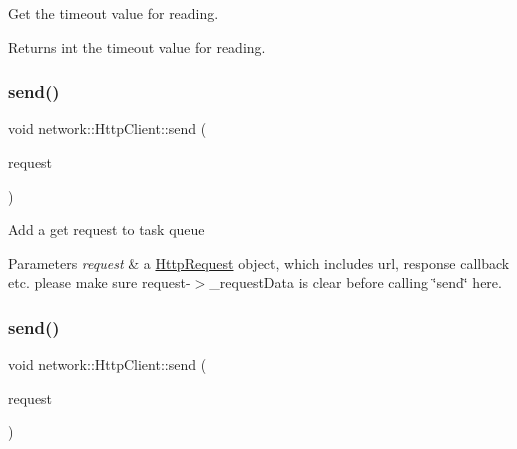 Get the timeout value for reading.

\begin{DoxyReturn}{Returns}
int the timeout value for reading. 
\end{DoxyReturn}
\mbox{\label{classnetwork_1_1HttpClient_a912e8ba506a485bf5fcc2d06293f118b}} 
\subsubsection{\texorpdfstring{send()}{send()}\hspace{0.1cm}{\footnotesize\ttfamily [1/2]}}
{\footnotesize\ttfamily void network\+::\+Http\+Client\+::send (\begin{DoxyParamCaption}\item[{\hyperlink{classnetwork_1_1HttpRequest}{Http\+Request} $\ast$}]{request }\end{DoxyParamCaption})}

Add a get request to task queue


\begin{DoxyParams}{Parameters}
{\em request} & a \hyperlink{classnetwork_1_1HttpRequest}{Http\+Request} object, which includes url, response callback etc. please make sure request-\/$>$\+\_\+request\+Data is clear before calling \char`\"{}send\char`\"{} here. \\
\hline
\end{DoxyParams}
\mbox{\label{classnetwork_1_1HttpClient_a912e8ba506a485bf5fcc2d06293f118b}} 
\subsubsection{\texorpdfstring{send()}{send()}\hspace{0.1cm}{\footnotesize\ttfamily [2/2]}}
{\footnotesize\ttfamily void network\+::\+Http\+Client\+::send (\begin{DoxyParamCaption}\item[{\hyperlink{classnetwork_1_1HttpRequest}{Http\+Request} $\ast$}]{request }\end{DoxyParamCaption})}

